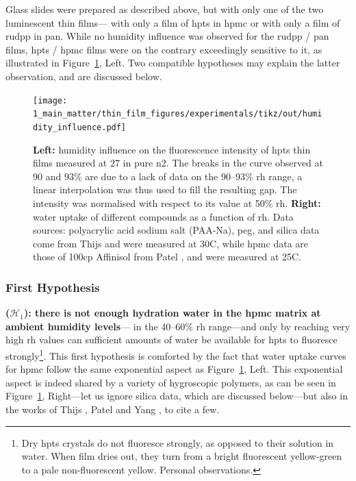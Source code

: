 Glass slides were prepared as described above, but with only one of the two luminescent thin films---\ie{} with only a film of \gls{hpts} in \gls{hpmc} or with only a film of \gls{rudpp} in \gls{pan}. While no humidity influence was observed for the \gls{rudpp} / \gls{pan} films, \gls{hpts} / \gls{hpmc} films were on the contrary exceedingly sensitive to it, as illustrated in Figure~\ref{fig:thin_film:experimental:humidity_influence}, Left. Two compatible hypotheses may explain the latter observation, and are discussed below.

\begin{figure}
	\centering
	\texttt{[image: 1\_main\_matter/thin\_film\_figures/experimentals/tikz/out/humidity\_influence.pdf]}
	\caption[Humidity influence on \gls{hpts} thin films fluorescence, and comparison with the water uptake of other polymers.]{\textbf{Left:} humidity influence on the fluorescence intensity of \gls{hpts} thin films measured at 27{\degree} in pure \gls{n2}. The breaks in the curve observed at 90 and 93\% are due to a lack of data on the 90--93\% \gls{rh} range, a linear interpolation was thus used to fill the resulting gap. The intensity was normalised with respect to its value at 50\% \gls{rh}. \textbf{Right:} water uptake of different compounds as a function of \gls{rh}. Data sources: polyacrylic acid sodium salt (PAA-Na), \gls{peg}, and silica data come from Thijs \etal{}\cite{thijs2007} and were measured at 30{\degree}C, while \gls{hpmc} data are those of 100cp Affinisol from Patel \etal{}\cite{patel2022_part2}, and were measured at 25{\degree}C.}
	\label{fig:thin_film:experimental:humidity_influence}
\end{figure}

\subsubsection{First Hypothesis}

\textbf{($\mathcal{H}_1$): there is not enough hydration water in the \gls{hpmc} matrix at ambient humidity levels}---\ie{} in the 40--60\% \gls{rh} range---and only by reaching very high \gls{rh} values can sufficient amounts of water be available for \gls{hpts} to fluoresce strongly\footnote{Dry \gls{hpts} crystals do not fluoresce strongly, as opposed to their solution in water. When film dries out, they turn from a bright fluorescent yellow-green to a pale non-fluorescent yellow. Personal observations.}. This first hypothesis is comforted by the fact that water uptake curves for \gls{hpmc} follow the same exponential aspect as Figure~\ref{fig:thin_film:experimental:humidity_influence}, Left. This exponential aspect is indeed shared by a variety of hygroscopic polymers, as can be seen in Figure~\ref{fig:thin_film:experimental:humidity_influence}, Right---let us ignore silica data, which are discussed below---but also in the works of Thijs \etal{}\cite{thijs2007}, Patel \etal{}\cite{patel2022_part1, patel2022_part2, patel2023_part3} and Yang \etal{}\cite{yang2020capsule}, to cite a few.

